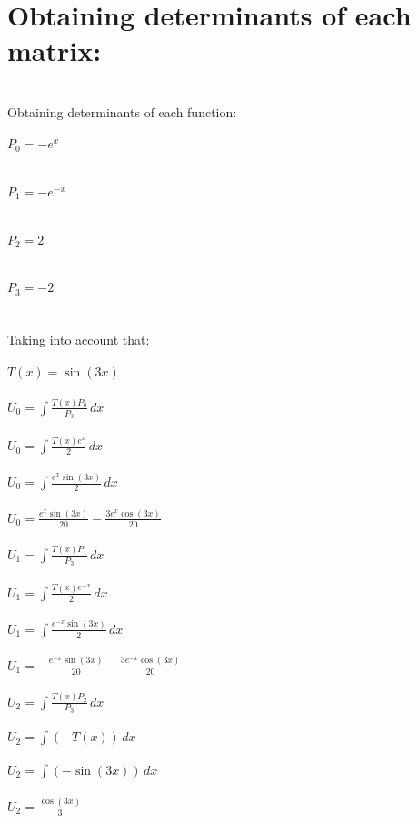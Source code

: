 \documentclass{article}
\begin{document}
\section{Obtaining determinants of each matrix:}\\
Obtaining determinants of each function: \\ \\${P}_{0} = - e^{x}$\\ \\ \\${P}_{1} = - e^{- x}$\\ \\ \\${P}_{2} = 2$\\ \\ \\${P}_{3} = -2$\\ \\ \\Taking into account that: \\ \\$T{\left(x \right)} = \sin{\left(3 x \right)}$\\ \\${U}_{0} = \int \frac{T{\left(x \right)} {P}_{0}}{{P}_{3}}\, dx$\\ \\${U}_{0} = \int \frac{T{\left(x \right)} e^{x}}{2}\, dx$\\ \\${U}_{0} = \int \frac{e^{x} \sin{\left(3 x \right)}}{2}\, dx$\\ \\${U}_{0} = \frac{e^{x} \sin{\left(3 x \right)}}{20} - \frac{3 e^{x} \cos{\left(3 x \right)}}{20}$\\ \\${U}_{1} = \int \frac{T{\left(x \right)} {P}_{1}}{{P}_{3}}\, dx$\\ \\${U}_{1} = \int \frac{T{\left(x \right)} e^{- x}}{2}\, dx$\\ \\${U}_{1} = \int \frac{e^{- x} \sin{\left(3 x \right)}}{2}\, dx$\\ \\${U}_{1} = - \frac{e^{- x} \sin{\left(3 x \right)}}{20} - \frac{3 e^{- x} \cos{\left(3 x \right)}}{20}$\\ \\${U}_{2} = \int \frac{T{\left(x \right)} {P}_{2}}{{P}_{3}}\, dx$\\ \\${U}_{2} = \int \left(- T{\left(x \right)}\right)\, dx$\\ \\${U}_{2} = \int \left(- \sin{\left(3 x \right)}\right)\, dx$\\ \\${U}_{2} = \frac{\cos{\left(3 x \right)}}{3}$\\ \\\\
\end{document}
